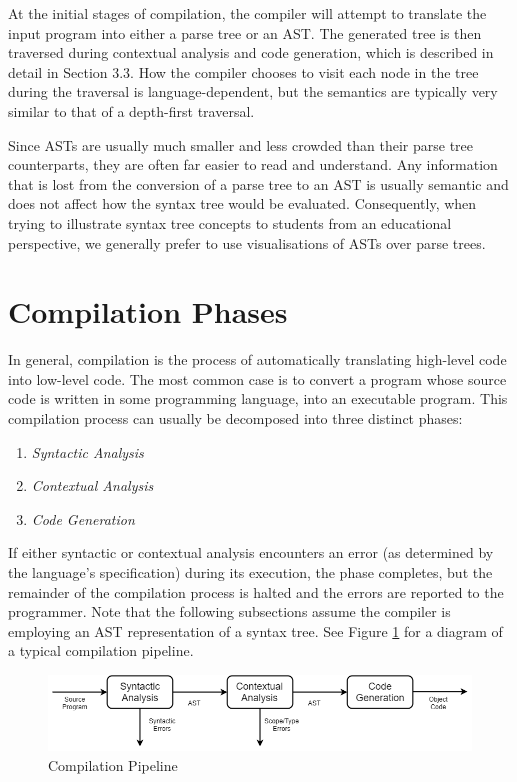 \documentclass{l4proj}
\begin{document}
At the initial stages of compilation, the compiler will attempt to translate the input program into either a parse tree or an AST. The generated tree is then traversed during contextual analysis and code generation, which is described in detail in Section 3.3. How the compiler chooses to visit each node in the tree during the traversal is language-dependent, but the semantics are typically very similar to that of a depth-first traversal. 

Since ASTs are usually much smaller and less crowded than their parse tree counterparts, they are often far easier to read and understand. Any information that is lost from the conversion of a parse tree to an AST is usually semantic and does not affect how the syntax tree would be evaluated. Consequently, when trying to illustrate syntax tree concepts to students from an educational perspective, we generally prefer to use visualisations of ASTs over parse trees.

\section{Compilation Phases}
In general, compilation is the process of automatically translating high-level code into low-level code. The most common case is to convert a program whose source code is written in some programming language, into an executable program. This compilation process can usually be decomposed into three distinct phases: 
\begin{enumerate}[label=\alph*)]
\item \textit {Syntactic Analysis}
\item \textit {Contextual Analysis}
\item \textit {Code Generation}
\end{enumerate}
If either syntactic or contextual analysis encounters an error (as determined by the language's specification) during its execution, the phase completes, but the remainder of the compilation process is halted and the errors are reported to the programmer. Note that the following subsections assume the compiler is employing an AST representation of a syntax tree. See Figure \ref{fig:compilation-pipeline} for a diagram of a typical compilation pipeline.

\begin{figure}[h]
\centering
\includegraphics[scale=0.5]{images/3-2a.png}
\caption{Compilation Pipeline}
\label{fig:compilation-pipeline}	
\end{figure}
\end{document}
